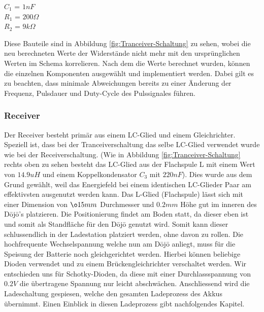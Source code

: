 \begin{center}
$C_{1}$ = $1nF$\\
$R_{1}$ = $200\Omega$\\
$R_{2}$ = $9k\Omega$\\
\end{center}

Diese Bauteile sind in Abbildung \ref{fig:Tranceiver-Schaltung} zu sehen, wobei die neu berechneten Werte der Widerstände nicht mehr mit den ursprünglichen Werten im Schema korrelieren.
Nach dem die Werte berechnet wurden, können die einzelnen Komponenten ausgewählt und implementiert werden. Dabei gilt es zu beachten, dass minimale Abweichungen bereits zu einer Änderung der Frequenz, Pulsdauer und Duty-Cycle des Pulssignales führen.

\subsubsection*{Receiver}
Der Receiver besteht primär aus einem LC-Glied und einem Gleichrichter. Speziell ist, dass bei der Tranceiverschaltung das selbe LC-Glied verwendet wurde wie bei der Receiverschaltung. (Wie in Abbildung \ref{fig:Tranceiver-Schaltung} rechts oben zu sehen besteht das LC-Glied aus der Flachspule L mit einem Wert von $14.9uH$ und einem Koppelkondensator $C_{3}$ mit $220nF$). Dies wurde aus dem Grund gewählt, weil das Energiefeld bei einem identischen LC-Glieder Paar am effektivsten ausgenutzt werden kann. Das L-Glied (Flachspule) lässt sich mit einer Dimension von $\o 15mm$ Durchmesser und $0.2mm$ Höhe gut im inneren des Dōjō’s platzieren. Die Positionierung findet am Boden statt, da dieser eben ist und somit als Standfläche für den Dōjō genutzt wird. Somit kann dieser schlussendlich in der Ladestation platziert werden, ohne davon zu rollen. Die hochfrequente Wechselspannung welche nun am Dōjō anliegt, muss für die Speisung der Batterie noch gleichgerichtet werden. Hierbei können beliebige Dioden verwendet und zu einem Brückengleichrichter verschaltet werden. Wir entschieden uns für Schotky-Dioden, da diese mit einer Durchlassspannung von $0.2V$ die übertragene Spannung nur leicht abschwächen. Anschliessend wird die Ladeschaltung gespiesen, welche den gesamten Ladeprozess des Akkus übernimmt. Einen Einblick in diesen Ladeprozess gibt nachfolgendes Kapitel.

